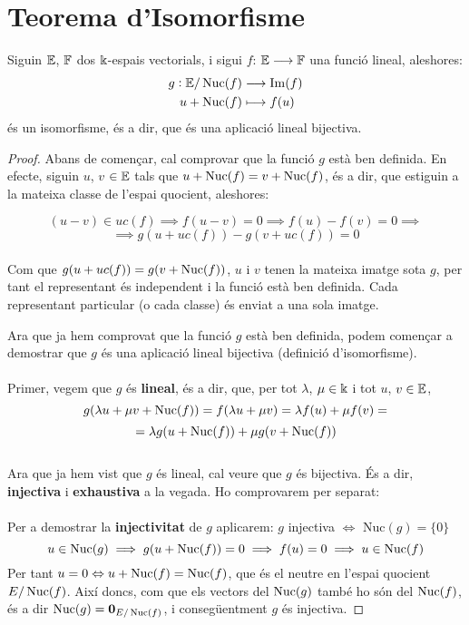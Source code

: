 \section{Teorema d'Isomorfisme}

Siguin $\mathbb{E}$, $\mathbb{F}$ dos $\Bbbk$-espais vectorials, i sigui $f$: $\mathbb{E} \longrightarrow \mathbb{F}$ una funció lineal, aleshores:
\[
\begin{aligned}
g: \mathbb{E}/\operatorname{Nuc}(f) & \longrightarrow \operatorname{Im}(f)\\
u + \operatorname{Nuc}(f) & \longmapsto f(u)\\
\end{aligned}
\]
és un isomorfisme, és a dir, que és una aplicació lineal bijectiva.
\\

\begin{proof}

Abans de començar, cal comprovar que la funció $g$ està ben definida. En efecte, siguin $u$, $v$ $\in \mathbb{E}$ tals que $u + \operatorname{Nuc}(f) = v + \operatorname{Nuc}(f)$, és a dir, que estiguin a la mateixa classe de l'espai quocient, aleshores:

$$(u-v) \in 
uc(f) \implies f(u-v) = 0 \implies f(u) - f(v) = 0 \implies$$
$$ \implies g(u + 
uc(f)) - g(v + 
uc(f)) = 0$$
\\
Com que $g(u + 
uc(f)) = g(v + \operatorname{Nuc}(f))$, $u$ i $v$ tenen la mateixa imatge sota $g$, per tant el representant és independent i la funció està ben definida. Cada representant particular (o cada classe) és enviat a una sola imatge.


Ara que ja hem comprovat que la funció $g$ està ben definida, podem començar a demostrar que $g$ és una aplicació lineal bijectiva (definició d'isomorfisme). \\\\Primer, vegem que  $g$ és \textbf{lineal}, és a dir, que, per tot $\lambda$, $\mu \in \Bbbk$ i tot $u$, $v \in \mathbb{E}$, 
$$g(\lambda u + \mu v + \operatorname{Nuc}(f))  = f(\lambda u + \mu v) = \lambda f(u) + \mu f(v) =$$
$$= \lambda g(u + \operatorname{Nuc}(f)) + \mu g(v + \operatorname{Nuc}(f))$$\\
Ara que ja hem vist que $g$ és lineal, cal veure que $g$ és bijectiva. És a dir, \textbf{injectiva} i \textbf{exhaustiva} a la vegada. Ho comprovarem per separat:
\\\\
Per a demostrar la \textbf{injectivitat} de $g$ aplicarem: $g$ injectiva $\Leftrightarrow$ Nuc$(g) = \{0\}$
$$u \in \operatorname{Nuc}(g) \implies g(u + \operatorname{Nuc}(f)) = 0 \implies f(u) = 0 \implies u \in \operatorname{Nuc}(f)$$
Per tant $u = 0 \Leftrightarrow u + \operatorname{Nuc}(f) = \operatorname{Nuc}(f)$, que és el neutre en l'espai quocient $E/\operatorname{Nuc}(f)$. Així doncs, com que els vectors del $\operatorname{Nuc}(g)$ també ho són del $\operatorname{Nuc}(f)$, és a dir $\operatorname{Nuc}(g) = {\textbf{0}_{E/\operatorname{Nuc}(f)}}$, i consegüentment $g$ és injectiva.



\end{proof}
